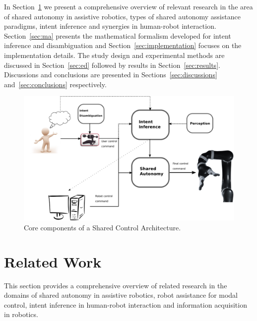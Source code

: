 In Section~\ref{sec:related-work} we present a comprehensive overview of relevant research in the area of shared autonomy in assistive robotics, types of shared autonomy assistance paradigms, intent inference and synergies in human-robot interaction. Section~\ref{sec:ma} presents the mathematical formalism developed for intent inference and disambiguation and Section~\ref{sec:implementation} focuses on the implementation details. The study design and experimental methods are discussed in Section~\ref{sec:ed} followed by results in Section~\ref{sec:results}. Discussions and conclusions are presented in Sections~\ref{sec:discussions} and~\ref{sec:conclusions} respectively. 


%
\begin{figure}[t!]
	\includegraphics[keepaspectratio, width = \textwidth]{./figures/out.eps}
	\caption{Core components of a Shared Control Architecture. }
	\label{fig:shared_control}
\end{figure}

\section{Related Work}\label{sec:related-work}
This section provides a comprehensive overview of related research in the domains of shared autonomy in assistive robotics, robot assistance for modal control, intent inference in human-robot interaction and information acquisition in robotics. 

